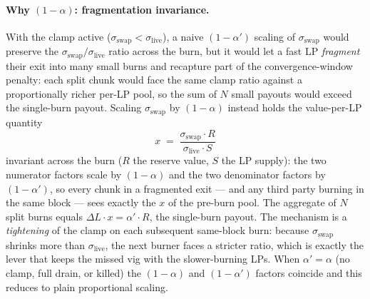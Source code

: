 \documentclass[11pt]{article}
\begin{document}
\paragraph{Why $(1-\alpha)$: fragmentation invariance.}
With the clamp active ($\sigma_{\mathrm{swap}} < \sigma_{\mathrm{live}}$),
a naive $(1 - \alpha')$ scaling of $\sigma_{\mathrm{swap}}$ would
preserve the $\sigma_{\mathrm{swap}}/\sigma_{\mathrm{live}}$ ratio
across the burn, but it would let a fast LP \emph{fragment} their exit
into many small burns and recapture part of the convergence-window
penalty: each split chunk would face the same clamp ratio against a
proportionally richer per-LP pool, so the sum of $N$ small payouts
would exceed the single-burn payout. Scaling $\sigma_{\mathrm{swap}}$ by
$(1 - \alpha)$ instead holds the value-per-LP quantity
\[
  x \;=\; \frac{\sigma_{\mathrm{swap}} \cdot R}{\sigma_{\mathrm{live}} \cdot S}
\]
invariant across the burn ($R$ the reserve value, $S$ the LP supply):
the two numerator factors scale by $(1 - \alpha)$ and the two
denominator factors by $(1 - \alpha')$, so every chunk in a fragmented
exit --- and any third party burning in the same block --- sees exactly
the $x$ of the pre-burn pool. The aggregate of $N$ split burns equals
$\Delta L \cdot x = \alpha' \cdot R$, the single-burn payout. The
mechanism is a \emph{tightening} of the clamp on each subsequent
same-block burn: because $\sigma_{\mathrm{swap}}$ shrinks more than
$\sigma_{\mathrm{live}}$, the next burner faces a stricter ratio, which
is exactly the lever that keeps the missed vig with the slower-burning
LPs. When $\alpha' = \alpha$ (no clamp, full drain, or killed) the
$(1-\alpha)$ and $(1-\alpha')$ factors coincide and this reduces to
plain proportional scaling.
\end{document}
